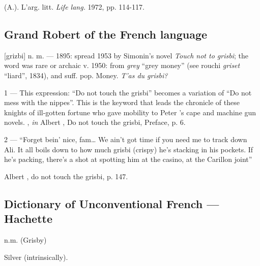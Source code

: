   (A.). L'arg. litt. \emph{Life lang.} 1972, pp. 114-117.

\subsection*{Grand Robert of the French language}

[grizbi] n. m. --- 1895: spread 1953 by Simonin's novel \emph{Touch not to grisbi}; the word was rare or archaic v. 1950: from \emph{grey} ``grey money'' (see rouchi \emph{griset} ``liard'', 1834), and suff. pop.  Money. \emph{T'as du grisbi?}

1 --- This expression: ``Do not touch the grisbi'' becomes a variation of ``Do not mess with the nippes''. This is the keyword that leads the chronicle of these knights of ill-gotten fortune who gave mobility to Peter 's cape and machine gun novels.
, \emph{in} Albert , Do not touch the grisbi, Preface, p. 6.

2 --- ``Forget bein' nice, fam\dots{} We ain't got time if you need me to track down Ali. It all boils down to how much grisbi (crispy) he's stacking in his pockets. If he’s packing, there’s a shot at spotting him at the casino, at the Carillon joint''

Albert , do not touch the grisbi, p. 147.

\subsection*{Dictionary of Unconventional French --- Hachette}

n.m. (Grisby)

Silver (intrinsically).


